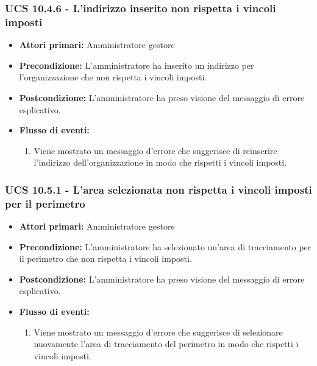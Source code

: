 \subsubsection{UCS 10.4.6 - L'indirizzo inserito non rispetta i vincoli imposti}%
\begin{itemize}
\item \textbf{Attori primari:} Amministratore gestore
\item \textbf{Precondizione:} L'amministratore ha inserito un indirizzo per l'organizzazione che non rispetta i vincoli imposti.
\item \textbf{Postcondizione:} L'amministratore ha preso visione del messaggio di errore esplicativo.
\item \textbf{Flusso di eventi:}
    \begin{enumerate}
    \item Viene mostrato un messaggio d'errore che suggerisce di reinserire l'indirizzo dell'organizzazione in modo che rispetti i vincoli imposti.
    \end{enumerate} 
\end{itemize}

\subsubsection{UCS 10.5.1 - L'area selezionata non rispetta i vincoli imposti per il perimetro}%
\begin{itemize}
\item \textbf{Attori primari:} Amministratore gestore
\item \textbf{Precondizione:} L'amministratore ha selezionato un'area di tracciamento per il perimetro che non rispetta i vincoli imposti.
\item \textbf{Postcondizione:} L'amministratore ha preso visione del messaggio di errore esplicativo.
\item \textbf{Flusso di eventi:}
    \begin{enumerate}
    \item Viene mostrato un messaggio d'errore che suggerisce di selezionare nuovamente l'area di tracciamento del perimetro in modo che rispetti i vincoli imposti.
    \end{enumerate} 
\end{itemize}

